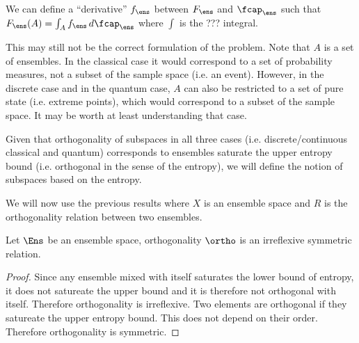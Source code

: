 \begin{conj}
	We can define a ``derivative'' $f_{\ens}$ between $F_{\ens}$ and $\fcap_{\ens}$ such that $F_{\ens}(A) = \int_A f_{\ens} \, d \fcap_{\ens}$ where $\int$ is the ??? integral.
\end{conj}

\begin{remark}
	This may still not be the correct formulation of the problem. Note that $A$ is a set of ensembles. In the classical case it would correspond to a set of probability measures, not a subset of the sample space (i.e. an event). However, in the discrete case and in the quantum case, $A$ can also be restricted to a set of pure state (i.e. extreme points), which would correspond to a subset of the sample space. It may be worth at least understanding that case.
\end{remark}



Given that orthogonality of subspaces in all three cases (i.e. discrete/continuous classical and quantum) corresponds to ensembles saturate the upper entropy bound (i.e. orthogonal in the sense of the entropy), we will define the notion of subspaces based on the entropy.

We will now use the previous results where $X$ is an ensemble space and $R$ is the orthogonality relation between two ensembles.

\begin{prop}
	Let $\Ens$ be an ensemble space, orthogonality $\ortho$ is an irreflexive symmetric relation.
\end{prop}

\begin{proof}
	Since any ensemble mixed with itself saturates the lower bound of entropy, it does not satureate the upper bound and it is therefore not orthogonal with itself. Therefore orthogonality is irreflexive. Two elements are orthogonal if they satureate the upper entropy bound. This does not depend on their order. Therefore orthogonality is symmetric.
\end{proof}

